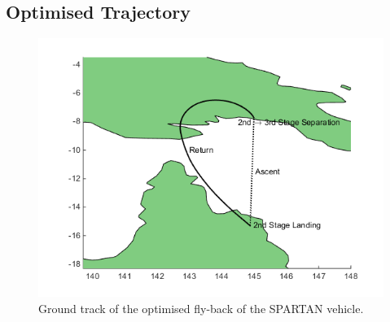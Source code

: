 \subsection{Optimised Trajectory}
\begin{figure}[t]
	\centering
	\includegraphics[width=0.6\linewidth]{Figures/6_flyback/lon-lat}
	\vspace{-10pt}
	\caption{ Ground track of the optimised fly-back of the SPARTAN vehicle.}
	\label{fig:lon-lat}
\end{figure}  



